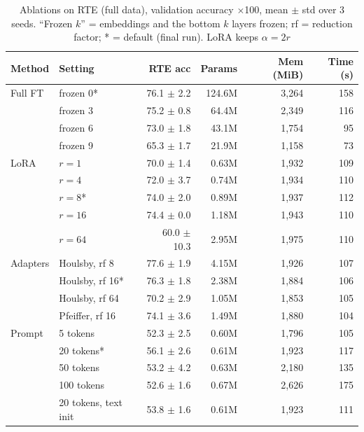\documentclass{nle}
\begin{document}
\begin{table}
  \caption{Ablations on RTE (full data), validation accuracy $\times$100, mean $\pm$ std over 3 seeds. ``Frozen $k$'' = embeddings and the bottom $k$ layers frozen; rf = reduction factor; * = default (final run). LoRA keeps $\alpha{=}2r$}
  \label{tab:ablation}
  \begin{minipage}{\textwidth}\footnotesize
    \begin{tabular}{llrrrr}
    \hline\hline
    Method & Setting & RTE acc & Params & Mem (MiB) & Time (s) \\
    \hline
    Full FT & frozen 0* & 76.1 $\pm$ 2.2 & 124.6M & 3,264 & 158 \\
     & frozen 3 & 75.2 $\pm$ 0.8 & 64.4M & 2,349 & 116 \\
     & frozen 6 & 73.0 $\pm$ 1.8 & 43.1M & 1,754 & 95 \\
     & frozen 9 & 65.3 $\pm$ 1.7 & 21.9M & 1,158 & 73 \\
    \hline
    LoRA & $r{=}1$ & 70.0 $\pm$ 1.4 & 0.63M & 1,932 & 109 \\
     & $r{=}4$ & 72.0 $\pm$ 3.7 & 0.74M & 1,934 & 110 \\
     & $r{=}8$* & 74.0 $\pm$ 2.0 & 0.89M & 1,937 & 112 \\
     & $r{=}16$ & 74.4 $\pm$ 0.0 & 1.18M & 1,943 & 110 \\
     & $r{=}64$ & 60.0 $\pm$ 10.3 & 2.95M & 1,975 & 110 \\
    \hline
    Adapters & Houlsby, rf 8 & 77.6 $\pm$ 1.9 & 4.15M & 1,926 & 107 \\
     & Houlsby, rf 16* & 76.3 $\pm$ 1.8 & 2.38M & 1,884 & 106 \\
     & Houlsby, rf 64 & 70.2 $\pm$ 2.9 & 1.05M & 1,853 & 105 \\
     & Pfeiffer, rf 16 & 74.1 $\pm$ 3.6 & 1.49M & 1,880 & 104 \\
    \hline
    Prompt & 5 tokens & 52.3 $\pm$ 2.5 & 0.60M & 1,796 & 105 \\
     & 20 tokens* & 56.1 $\pm$ 2.6 & 0.61M & 1,923 & 117 \\
     & 50 tokens & 53.2 $\pm$ 4.2 & 0.63M & 2,180 & 135 \\
     & 100 tokens & 52.6 $\pm$ 1.6 & 0.67M & 2,626 & 175 \\
     & 20 tokens, text init & 53.8 $\pm$ 1.6 & 0.61M & 1,923 & 111 \\
    \hline\hline
    \end{tabular}
  \end{minipage}
\end{table}
\end{document}

